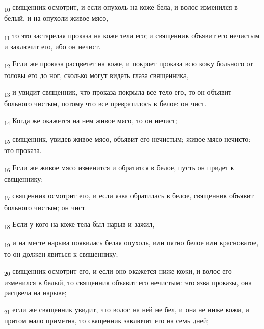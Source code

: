 \begin{tcolorbox}
\textsubscript{10} священник осмотрит, и если опухоль на коже бела, и волос изменился в белый, и на опухоли живое мясо,
\end{tcolorbox}
\begin{tcolorbox}
\textsubscript{11} то это застарелая проказа на коже тела его; и священник объявит его нечистым и заключит его, ибо он нечист.
\end{tcolorbox}
\begin{tcolorbox}
\textsubscript{12} Если же проказа расцветет на коже, и покроет проказа всю кожу больного от головы его до ног, сколько могут видеть глаза священника,
\end{tcolorbox}
\begin{tcolorbox}
\textsubscript{13} и увидит священник, что проказа покрыла все тело его, то он объявит больного чистым, потому что все превратилось в белое: он чист.
\end{tcolorbox}
\begin{tcolorbox}
\textsubscript{14} Когда же окажется на нем живое мясо, то он нечист;
\end{tcolorbox}
\begin{tcolorbox}
\textsubscript{15} священник, увидев живое мясо, объявит его нечистым; живое мясо нечисто: это проказа.
\end{tcolorbox}
\begin{tcolorbox}
\textsubscript{16} Если же живое мясо изменится и обратится в белое, пусть он придет к священнику;
\end{tcolorbox}
\begin{tcolorbox}
\textsubscript{17} священник осмотрит его, и если язва обратилась в белое, священник объявит больного чистым; он чист.
\end{tcolorbox}
\begin{tcolorbox}
\textsubscript{18} Если у кого на коже тела был нарыв и зажил,
\end{tcolorbox}
\begin{tcolorbox}
\textsubscript{19} и на месте нарыва появилась белая опухоль, или пятно белое или красноватое, то он должен явиться к священнику;
\end{tcolorbox}
\begin{tcolorbox}
\textsubscript{20} священник осмотрит его, и если оно окажется ниже кожи, и волос его изменился в белый, то священник объявит его нечистым: это язва проказы, она расцвела на нарыве;
\end{tcolorbox}
\begin{tcolorbox}
\textsubscript{21} если же священник увидит, что волос на ней не бел, и она не ниже кожи, и притом мало приметна, то священник заключит его на семь дней;
\end{tcolorbox}

